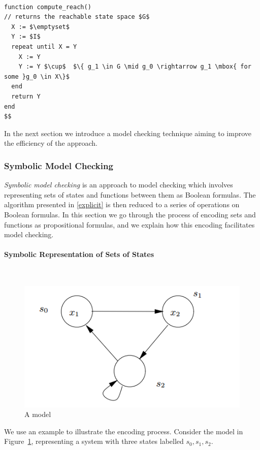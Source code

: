 \documentclass[11pt]{article}
\newcommand{\myparagraph}[1]{\paragraph{#1}\mbox{}\\}
\begin{document}
\begin{lstlisting}[mathescape]

function compute_reach()
// returns the reachable state space $G$ 
  X := $\emptyset$
  Y := $I$
  repeat until X = Y
    X := Y
    Y := Y $\cup$  $\{ g_1 \in G \mid g_0 \rightarrow g_1 \mbox{ for some }g_0 \in X\}$
  end
  return Y
end
$$
\end{lstlisting}

In the next section we introduce a model checking technique aiming to improve the efficiency of the approach. 



\subsubsection{Symbolic Model Checking}

\textit{Symbolic model checking} is an approach to model checking which involves representing sets of states and functions between them as Boolean formulas. The algorithm presented in \ref{explicit} is then reduced to a series of operations on Boolean formulas. In this section we go through the process of encoding sets and functions as propositional formulas, and we explain how this encoding facilitates model checking.

\myparagraph{Symbolic Representation of Sets of States}
\label{symbolic}
\begin{figure}
    \centering
    \includegraphics[scale=0.55]{symbolic_model_checking_example.PNG}
    \caption{A model}
    \label{fig:model_example}
\end{figure}

We use an example \cite{logic_in_computer_science} to illustrate the encoding process.
Consider the model in Figure~\ref {fig:model_example}, representing a system with three states labelled $s_0, s_1, s_2$. 
\end{document}
